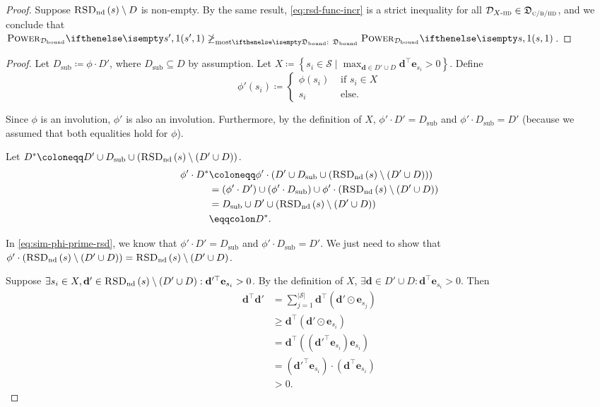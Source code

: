 \documentclass{article}
\renewcommand{\abs}[1]{\left|#1\right|}
\newcommand*{\prn}[1]{\left(#1\right)}
\renewcommand{\set}[1]{\left\{#1\right\}}
\newcommand*{\defeq}{\coloneqq} %
\newcommand*{\eqdef}{\eqqcolon} %
\newcommand*{\unitvec}[1][s]{\mathbf{e}_{#1}}
\newcommand*{\upsc}[1]{\text{\upshape\textsc{#1}}}
\newcommand*{\St}{\mathcal{S}}
\newcommand*{\D}{\mathcal{D}} %
\newcommand*{\distSet}{\mathfrak{D}}
\newcommand*{\DSetBCiid}{\distSet_{\textsc{c/b/}\iid}}
\newcommand*{\Dbd}{\D_{\text{bound}}}
\newcommand*{\DSetBd}{\distSet_\text{bound}}
\newcommand*{\dbf}{\mathbf{d}} %
\newcommand*{\RSDnd}[1][s]{\upsc{RSD}{\text{\upshape\textsubscript{nd}}}\prn{#1}}
\theoremstyle{definition}
\begin{document}
\begin{appendices}
\begin{proof}
Suppose $\RSDnd\setminus D$ is non-empty. By the same result, \cref{eq:rsd-func-incr} is a strict inequality for all $\Diid\in\DSetBCiid$, and we conclude that $\pwr[s',1][\Dbd]\not \geqMost[][\DSetBd] \pwr[s,1][\Dbd]$. 
\end{proof}

\rsdIC*
\begin{proof}
Let $D_\text{sub}\defeq\phi\cdot D'$, where $D_\text{sub}\subseteq D$ by assumption. Let $X\defeq \set{s_i\in \St \mid \max_{\dbf \in D'\cup D} \dbf^\top \unitvec[s_i]>0}$. Define
\begin{equation}
    \phi'(s_i)\defeq 
    \begin{cases}
    \phi(s_i) & \text{ if } s_i\in X\label{eq:phi-prime-def}\\
    s_i &\text{ else}.
    \end{cases}
\end{equation}

Since $\phi$ is an involution, $\phi'$ is also an involution. Furthermore, by the definition of $X$, $\phi'\cdot D'=D_\text{sub}$ and $\phi'\cdot D_\text{sub}=D'$ (because we assumed that both equalities hold for $\phi$). 

Let $D^*\defeq D'\cup D_\text{sub} \cup \prn{\RSDnd\setminus (D' \cup D)}$.
\begin{align}
    \phi'\cdot D^*&\defeq \phi'\cdot \prn{D'\cup D_\text{sub} \cup \prn{\RSDnd\setminus (D' \cup D)}} \\
    &=\prn{\phi'\cdot D'}\cup \prn{\phi'\cdot D_\text{sub}} \cup \phi'\cdot\prn{\RSDnd\setminus (D' \cup D)} \\
    &= D_\text{sub} \cup D' \cup \prn{\RSDnd\setminus (D' \cup D)}\label{eq:sim-phi-prime-rsd}\\
    &\eqdef D^*.\label{eq:fixing-rsd-perm}
\end{align}

In \cref{eq:sim-phi-prime-rsd}, we know that $\phi'\cdot D'=D_\text{sub}$ and $\phi'\cdot D_\text{sub}=D'$. We just need to show that $\phi'\cdot \prn{\RSDnd\setminus (D' \cup D)}=\RSDnd\setminus (D' \cup D)$. 

Suppose $\exists s_i\in X, \dbf' \in \RSDnd\setminus (D' \cup D):\dbf'^\top \unitvec[s_i]>0$. By the definition of $X$, $\exists \dbf \in D' \cup D:\dbf^\top \unitvec[s_i]>0$. Then 
\begin{align}
    \dbf^\top \dbf'&=\sum_{j=1}^{\abs{\St}} \dbf^\top (\dbf'\odot\unitvec[s_j])\label{eq:dot-had}\\
    &\geq \dbf^\top (\dbf'\odot\unitvec[s_i])\label{eq:non-neg-rsd-entry}\\
    &=\dbf^\top \prn{(\dbf'^\top \unitvec[s_i])\unitvec[s_i]}\\
    &= (\dbf'^\top \unitvec[s_i]) \cdot (\dbf^\top\unitvec[s_i])\\
    &>0.\label{eq:pos-rsd-agree}
\end{align}


\end{proof}
\end{appendices}
\end{document}

